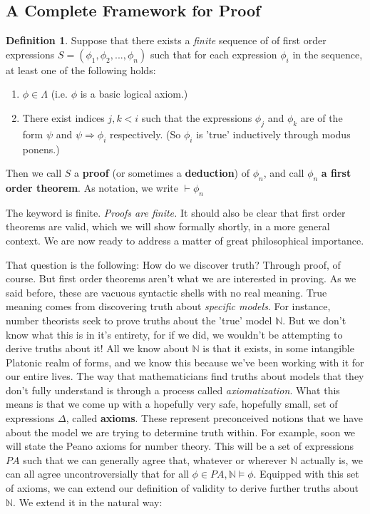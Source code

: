 \documentclass{article}
\theoremstyle{definition}
\newtheorem{definition}{Definition}[section]
\theoremstyle{plain}
\theoremstyle{theorem}
\begin{document}
\subsection{A Complete Framework for Proof}
\begin{definition}
    Suppose that there exists a \textit{finite} sequence of of first order expressions $S = (\phi_1,\phi_2,...,\phi_n)$ such that for each expression $\phi_i$ in the sequence, at least one of the following holds:
    \begin{enumerate}
        \item $\phi \in \Lambda$ (i.e. $\phi$ is a basic logical axiom.)
        \item There exist indices $j,k<i$ such that the expressions $\phi_j$ and $\phi_k$ are of the form $\psi$ and $\psi \Rightarrow \phi_i$ respectively. (So $\phi_i$ is 'true' inductively through modus ponens.)
    \end{enumerate}
    Then we call $S$ a \textbf{proof} (or sometimes a \textbf{deduction}) of $\phi_n$, and call $\phi_n$ \textbf{a first order theorem}. As notation, we write $\vdash \phi_n$
\end{definition}
The keyword is finite. \textit{Proofs are finite.} It should also be clear that first order theorems are valid, which we will show formally shortly, in a more general context. We are now ready to address a matter of great philosophical importance.
\par That question is the following: How do we discover truth? Through proof, of course. But first order theorems aren't what we are interested in proving. As we said before, these are vacuous syntactic shells with no real meaning. True meaning comes from discovering truth about \textit{specific models}. For instance, number theorists seek to prove truths about the 'true' model $\mathbb{N}$. But we don't know what this is in it's entirety, for if we did, we wouldn't be attempting to derive truths about it! All we know about $\mathbb{N}$ is that it exists, in some intangible Platonic realm of forms, and we know this because we've been working with it for our entire lives. The way that mathematicians find truths about models that they don't fully understand is through a process called \textit{axiomatization}. What this means is that we come up with a hopefully very safe, hopefully small, set of expressions $\Delta$, called \textbf{axioms}. These represent preconceived notions that we have about the model we are trying to determine truth within. For example, soon we will state the Peano axioms for number theory. This will be a set of expressions $PA$ such that we can generally agree that, whatever or wherever $\mathbb{N}$ actually is, we can all agree uncontroversially that for all $\phi \in PA, \mathbb{N} \models \phi$. Equipped with this set of axioms, we can extend our definition of validity to derive further truths about $\mathbb{N}$. We extend it in the natural way: 
\end{document}
